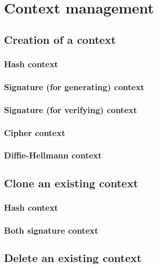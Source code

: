 \chapter{Context management}

\section{Creation of a context}
\subsection{Hash context}
\subsection{Signature (for generating) context}
\subsection{Signature (for verifying) context}
\subsection{Cipher context}
\subsection{Diffie-Hellmann context}


\section{Clone an existing context}
\subsection{Hash context}
\subsection{Both signature context}

\section{Delete an existing context}